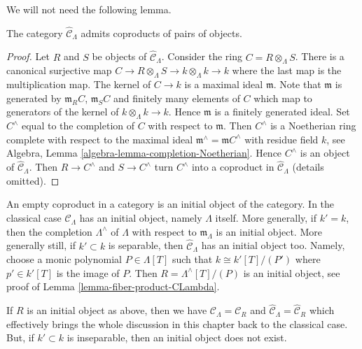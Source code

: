\noindent
We will not need the following lemma.

\begin{lemma}
\label{lemma-CLambdahat-coproducts}
The category $\widehat{\mathcal{C}}_\Lambda$ admits coproducts
of pairs of objects.
\end{lemma}

\begin{proof}
Let $R$ and $S$ be objects of $\widehat{\mathcal{C}}_\Lambda$.
Consider the ring $C = R \otimes_\Lambda S$. There is a canonical
surjective map $C \to R \otimes_\Lambda S \to k \otimes_\Lambda k \to k$
where the last map is the multiplication map. The kernel of
$C \to k$ is a maximal ideal $\mathfrak m$. Note that $\mathfrak m$
is generated by $\mathfrak m_R C$, $\mathfrak m_S C$ and finitely many
elements of $C$ which map to generators of the kernel of
$k \otimes_\Lambda k \to k$. Hence $\mathfrak m$ is a finitely
generated ideal. Set
$C^\wedge$ equal to the completion of $C$ with respect to $\mathfrak m$.
Then $C^\wedge$ is a Noetherian ring complete with respect to
the maximal ideal $\mathfrak m^\wedge = \mathfrak mC^\wedge$
with residue field $k$, see
Algebra, Lemma \ref{algebra-lemma-completion-Noetherian}.
Hence $C^\wedge$ is an object of $\widehat{\mathcal{C}}_\Lambda$.
Then $R \to C^\wedge$ and $S \to C^\wedge$ turn $C^\wedge$
into a coproduct in $\widehat{\mathcal{C}}_\Lambda$ (details omitted).
\end{proof}

\noindent
An empty coproduct in a category is an initial object of the category.
In the classical case $\widehat{\mathcal{C}}_\Lambda$ has an initial
object, namely $\Lambda$ itself. More generally, if $k' = k$, then
the completion $\Lambda^\wedge$ of $\Lambda$ with respect to
$\mathfrak m_\Lambda$ is an initial object. More generally still, if
$k' \subset k$ is separable, then $\widehat{\mathcal{C}}_\Lambda$ has an
initial object too. Namely, choose a monic polynomial $P \in \Lambda[T]$
such that $k \cong k'[T]/(P')$ where $p' \in k'[T]$ is the image
of $P$. Then $R = \Lambda^\wedge[T]/(P)$ is an initial object, see proof of
Lemma \ref{lemma-fiber-product-CLambda}.

\medskip\noindent
If $R$ is an initial object as above, then we have
$\mathcal{C}_\Lambda = \mathcal{C}_R$ and
$\widehat{\mathcal{C}}_\Lambda = \widehat{\mathcal{C}}_R$ which effectively
brings the whole discussion in this chapter back to the classical case.
But, if $k' \subset k$ is inseparable, then an initial object does not
exist.

